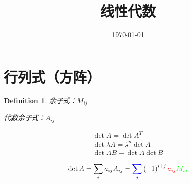 \documentclass{article}
\title{线性代数}
\author{}
\date{\today}
\begin{document}
\hypersetup{
    hidelinks,
    allcolors = black,
    breaklinks = true
}

\newtheorem{definition}{Definition}[subsection]
\newtheorem{theorem}{Theorem}[subsection]
\newtheorem{corollary}{Corollary}[theorem]
\renewcommand{\proofname}{\indent\bf Proof}

\def\v{\boldsymbol v}
\def\w{\boldsymbol w}
\def\ev{\boldsymbol e}
\def\pv{\boldsymbol p}

\newcommand{\abs}[1]{\left|#1\right|}
\newcommand{\p}[1]{\left(#1\right)}

\begin{titlepage}
    \maketitle
\end{titlepage}

\tableofcontents
\newpage

\section{行列式（方阵）}

\begin{definition}
    余子式：$M_{ij}$

    代数余子式：$A_{ij}$
\end{definition}

\[\begin{gathered}
        \det A=\det A^T\\
        \det\lambda A=\lambda^n\det A\\
        \det AB=\det A\det B
    \end{gathered}\]

\[\det A=\sum_ia_{ij}A_{ij}={\textcolor{blue}{\sum_j}}\p{-1}^{i+j}\textcolor{red}{a_{ij}}\textcolor{green}{M_{ij}}\]
\end{document}
